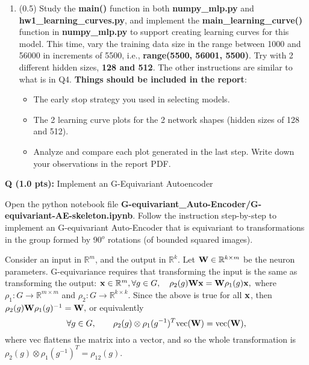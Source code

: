 \documentclass{article}
\newcounter{questionno}
\newcounter{partno}
\newcommand{\question}[1]{
\noindent
\newline
\stepcounter{questionno}
\setcounter{partno}{0}
{\bf Q\arabic{questionno} (#1 pts): }
}
\begin{document}
\begin{enumerate}
    \item (0.5) Study the \textbf{main()} function in both \textbf{numpy\_mlp.py} and \textbf{hw1\_learning\_curves.py}, and implement the \textbf{main\_learning\_curve()} function in \textbf{numpy\_mlp.py} to support creating learning curves for this model.  This time, vary the training data size in the range between 1000 and 56000 in increments of 5500, i.e., \textbf{range(5500, 56001, 5500)}. Try with 2 different hidden sizes, \textbf{128 and 512}. The other instructions are similar to what is in Q4. 
    \textbf{Things should be included in the report}:
      \begin{itemize}
        \item The early stop strategy you used in selecting models.
        \item The 2 learning curve plots for the 2 network shapes (hidden sizes of 128 and 512).
        \item Analyze and compare each plot generated in the last step. Write down
              your observations in the report PDF.
      \end{itemize}
    
\end{enumerate}

\newpage
\question{1.0}{Implement an G-Equivariant Autoencoder}

Open the python notebook file
\textbf{G-equivariant\_Auto-Encoder/G-equivariant-AE-skeleton.ipynb}. Follow the instruction step-by-step to implement an G-equivariant Auto-Encoder that is equivariant to transformations in the group formed by 90$^o$ rotations (of bounded squared images). 

Consider an input in $\mathbb{R}^m$, and the output in $\mathbb{R}^k$. Let ${\bf W} \in \mathbb{R}^{k \times m}$ be the neuron parameters. G-equivariance requires that transforming the input is the same as transforming the output: $
{\bf x} \in \mathbb{R}^m, \forall g \in G , \quad \rho_2(g) {\bf W} {\bf x} =  {\bf W} \rho_1(g) {\bf x},
$ where $\rho_1:G \to \mathbb{R}^{m \times m}$ and $\rho_2:G \to \mathbb{R}^{k \times k}$. Since the above is true for all ${\bf x}$, then  $\rho_2(g) {\bf W} \rho_1(g)^{-1} =  {\bf W},$ or equivalently  
$$\forall g \in G, \qquad \rho_2(g) \otimes \rho_1(g^{-1})^T \text{vec}({\bf W})  =  \text{vec}({\bf W}),$$ 
where vec flattens the matrix into a vector, and so the whole transformation is $\rho_2(g) \otimes \rho_1(g^{-1})^T = \rho_{12}(g)$.
\end{document}
